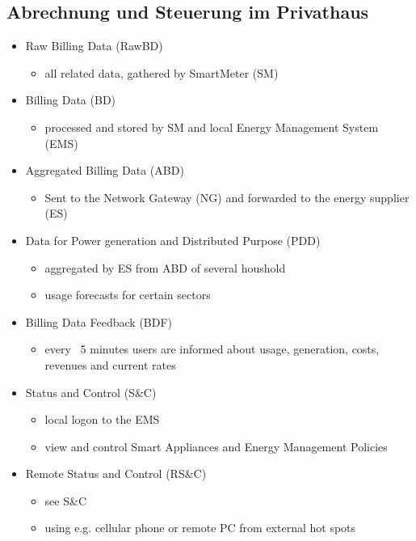 \documentclass[a4paper, 12pt]{article}
\begin{document}
\subsection{Abrechnung und Steuerung im Privathaus}
\begin{itemize}

\item Raw Billing Data (RawBD)
\begin{itemize}
\item all related data, gathered by SmartMeter (SM)
\end{itemize}

\item Billing Data (BD)
\begin{itemize}
\item processed and stored by SM and local Energy Management System (EMS)
\end{itemize}

\item Aggregated Billing Data (ABD)
\begin{itemize}
\item Sent to the Network Gateway (NG) and forwarded to the energy supplier (ES)
\end{itemize}

\item Data for Power generation and Distributed Purpose (PDD)
\begin{itemize}
\item aggregated by ES from ABD of several houshold
\item usage forecasts for certain sectors
\end{itemize}

\item Billing Data Feedback (BDF)
\begin{itemize}
\item every ~5 minutes users are informed about usage, generation, costs, revenues and current rates
\end{itemize}

\item Status and Control (S\&C)
\begin{itemize}
\item local logon to the EMS
\item view and control Smart Appliances and Energy Management Policies
\end{itemize}

\item Remote Status and Control (RS\&C)
\begin{itemize}
\item see S\&C
\item using e.g. cellular phone or remote PC from external hot spots
\end{itemize}

\end{itemize}
\end{document}

